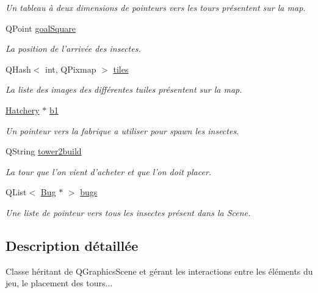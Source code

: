 \begin{DoxyCompactItemize}
\begin{DoxyCompactList}\small\item\em Un tableau à deux dimensions de pointeurs vers les tours présentent sur la map. \end{DoxyCompactList}\item 
QPoint \hyperlink{classRender_a08247005a2c595988f8a0ab14a8b1ad9}{goalSquare}
\begin{DoxyCompactList}\small\item\em La position de l'arrivée des insectes. \end{DoxyCompactList}\item 
QHash$<$ int, QPixmap $>$ \hyperlink{classRender_aaa10cde2c7a766914312f85d7c7eb25c}{tiles}
\begin{DoxyCompactList}\small\item\em La liste des images des différentes tuiles présentent sur la map. \end{DoxyCompactList}\item 
\hyperlink{classHatchery}{Hatchery} $\ast$ \hyperlink{classRender_ac6b86ad92172fefa5b9a56b31e9055d3}{b1}
\begin{DoxyCompactList}\small\item\em Un pointeur vers la fabrique a utiliser pour spawn les insectes. \end{DoxyCompactList}\item 
QString \hyperlink{classRender_ae8f2c323913fe8b89e0e7f443ef41ae0}{tower2build}
\begin{DoxyCompactList}\small\item\em La tour que l'on vient d'acheter et que l'on doit placer. \end{DoxyCompactList}\item 
QList$<$ \hyperlink{classBug}{Bug} $\ast$ $>$ \hyperlink{classRender_a3d5b29479d129b61c6ad8f3eec2f1f76}{bugs}
\begin{DoxyCompactList}\small\item\em Une liste de pointeur vers tous les insectes présent dans la Scene. \end{DoxyCompactList}\end{DoxyCompactItemize}


\subsection{Description détaillée}
Classe héritant de QGraphicsScene et gérant les interactions entre les éléments du jeu, le placement des tours... 

